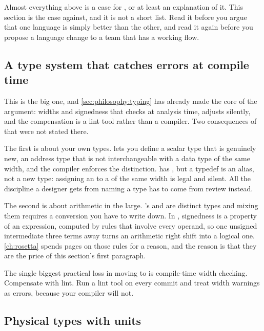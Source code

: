 Almost everything above is a case for \SV{}, or at least an explanation of it.
This section is the case against, and it is not a short list. Read it before
you argue that one language is simply better than the other, and read it again
before you propose a language change to a team that has a working \VHDL{}
flow.

\subsection{A type system that catches errors at compile time}

This is the big one, and \cref{sec:philosophy:typing} has already made the
core of the argument: widths and signedness that \VHDL{} checks at analysis
time, \SV{} adjusts silently, and the compensation is a lint tool rather than
a compiler. Two consequences of that were not stated there.

The first is about your own types. \VHDL{} lets you define a scalar type that
is genuinely new, an address type that is not interchangeable with a data type
of the same width, and the compiler enforces the distinction. \SV{} has
, but a typedef is an alias, not a new type: assigning an
 to a  of the same width is legal and silent. All
the discipline a \VHDL{} designer gets from naming a type has to come from
review instead.

The second is about arithmetic in the large. \VHDL{}'s  and
 are distinct types and mixing them requires a conversion you
have to write down. In \SV{}, signedness is a property of an expression,
computed by rules that involve every operand, so one unsigned intermediate
three terms away turns an arithmetic right shift into a logical one.
\cref{ch:rosetta} spends pages on those rules for a reason, and the reason is
that they are the price of this section's first paragraph.

\begin{ruleofthumb}
The single biggest practical loss in moving to \SV{} is compile-time width
checking. Compensate with lint. Run a lint tool on every commit and treat
width warnings as errors, because your compiler will not.
\end{ruleofthumb}

\subsection{Physical types with units}

